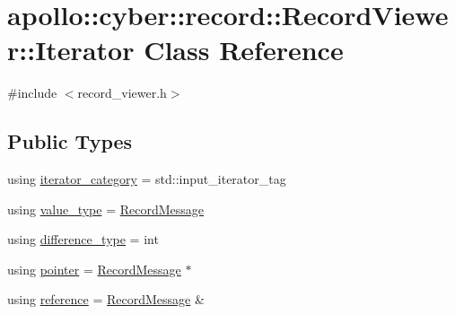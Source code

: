 \hypertarget{classapollo_1_1cyber_1_1record_1_1RecordViewer_1_1Iterator}{\section{apollo\-:\-:cyber\-:\-:record\-:\-:Record\-Viewer\-:\-:Iterator Class Reference}
\label{classapollo_1_1cyber_1_1record_1_1RecordViewer_1_1Iterator}
}


{\ttfamily \#include $<$record\-\_\-viewer.\-h$>$}

\subsection*{Public Types}
\begin{DoxyCompactItemize}
\item 
using \hyperlink{classapollo_1_1cyber_1_1record_1_1RecordViewer_1_1Iterator_a45e3f7f65e6c5d011bcf253ddf994e42}{iterator\-\_\-category} = std\-::input\-\_\-iterator\-\_\-tag
\item 
using \hyperlink{classapollo_1_1cyber_1_1record_1_1RecordViewer_1_1Iterator_a0de09c9c8009daa91416ddcfcf3b222e}{value\-\_\-type} = \hyperlink{structapollo_1_1cyber_1_1record_1_1RecordMessage}{Record\-Message}
\item 
using \hyperlink{classapollo_1_1cyber_1_1record_1_1RecordViewer_1_1Iterator_a744368463a3f6ed5345c4614bff536f7}{difference\-\_\-type} = int
\item 
using \hyperlink{classapollo_1_1cyber_1_1record_1_1RecordViewer_1_1Iterator_a9f3cbce1cbf35a09693e35abd4c21728}{pointer} = \hyperlink{structapollo_1_1cyber_1_1record_1_1RecordMessage}{Record\-Message} $\ast$
\item 
using \hyperlink{classapollo_1_1cyber_1_1record_1_1RecordViewer_1_1Iterator_a670a19f28cd3f2db0e69d0167787021a}{reference} = \hyperlink{structapollo_1_1cyber_1_1record_1_1RecordMessage}{Record\-Message} \&
\end{DoxyCompactItemize}
